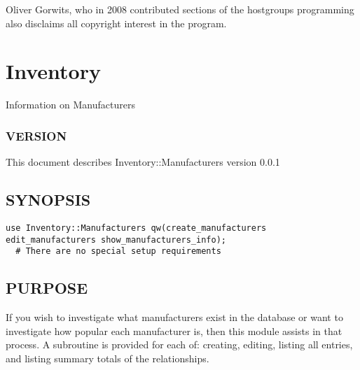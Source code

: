 \documentclass{book}
\begin{document}
Oliver Gorwits, who in 2008 contributed sections of the hostgroups programming also disclaims all copyright interest in the program.




\section{Inventory}
\label{_Inventory::Manufacturers}
\hypertarget{_Inventory::Manufacturers}{}



Information on Manufacturers


\subsubsection{VERSION}
\label{Inventory::Manufacturers_VERSION}
\hypertarget{Inventory::Manufacturers_VERSION}{}



This document describes Inventory::Manufacturers version 0.0.1


\subsection{SYNOPSIS}
\label{Inventory::Manufacturers_SYNOPSIS}
\hypertarget{Inventory::Manufacturers_SYNOPSIS}{}


\begin{lstlisting}[frame=lines,gobble=1]
  use Inventory::Manufacturers qw(create_manufacturers edit_manufacturers show_manufacturers_info);
  # There are no special setup requirements
\end{lstlisting}


\subsection{PURPOSE}
\label{Inventory::Manufacturers_PURPOSE}
\hypertarget{Inventory::Manufacturers_PURPOSE}{}



If you wish to investigate what manufacturers exist in the database or want to investigate how popular each manufacturer is, then this module assists in that process. A subroutine is provided for each of: creating, editing, listing all entries, and listing summary totals of the relationships.
\end{document}
